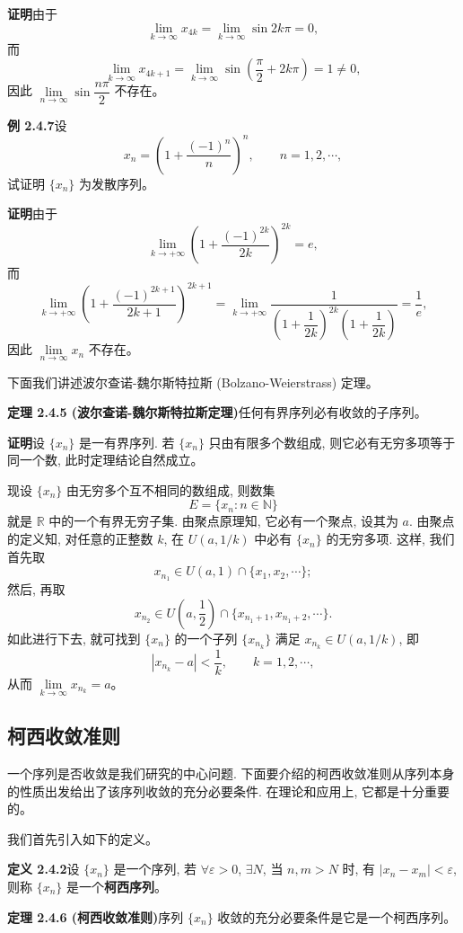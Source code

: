 \documentclass[UTF8, 12pt, fontset=fandol, oneside]{ctexart}
\begin{document}
\noindent\textbf{证明}\quad 由于
\[
  \lim_{k\to\infty}x_{4k}
  =
  \lim_{k\to\infty}\sin2k\pi=0,
\]
而
\[
  \lim_{k\to\infty}x_{4k+1}
  =
  \lim_{k\to\infty}\sin\left(\frac\pi2+2k\pi\right)=1\ne0,
\]
因此 $\lim\limits_{n\to\infty}\sin\dfrac{n\pi}{2}$ 不存在。

\noindent\textbf{例 2.4.7}\quad 设
\[
  x_n=\left(1+\frac{(-1)^n}{n}\right)^n,\qquad n=1,2,\cdots,
\]
试证明 $\{x_n\}$ 为发散序列。

\noindent\textbf{证明}\quad 由于
\[
  \lim_{k\to+\infty}\left(1+\frac{(-1)^{2k}}{2k}\right)^{2k}=e,
\]
而
\[
  \lim_{k\to+\infty}\left(1+\frac{(-1)^{2k+1}}{2k+1}\right)^{2k+1}
  =
  \lim_{k\to+\infty}\frac1{\left(1+\dfrac1{2k}\right)^{2k}\left(1+\dfrac1{2k}\right)}
  =
  \frac1e,
\]
因此 $\lim\limits_{n\to\infty}x_n$ 不存在。

下面我们讲述波尔查诺-魏尔斯特拉斯 (Bolzano-Weierstrass) 定理。

\noindent\textbf{定理 2.4.5 (波尔查诺-魏尔斯特拉斯定理)}\quad 任何有界序列必有收敛的子序列。

\noindent\textbf{证明}\quad 设 $\{x_n\}$ 是一有界序列. 若 $\{x_n\}$ 只由有限多个数组成, 则它必有无穷多项等于同一个数, 此时定理结论自然成立。

现设 $\{x_n\}$ 由无穷多个互不相同的数组成, 则数集
\[
  E=\{x_n:n\in\mathbb{N}\}
\]
就是 $\mathbb{R}$ 中的一个有界无穷子集. 由聚点原理知, 它必有一个聚点, 设其为 $a$. 由聚点的定义知, 对任意的正整数 $k$, 在 $U(a,1/k)$ 中必有 $\{x_n\}$ 的无穷多项. 这样, 我们首先取
\[
  x_{n_1}\in U(a,1)\cap\{x_1,x_2,\cdots\};
\]
然后, 再取
\[
  x_{n_2}\in U\left(a,\frac12\right)\cap\{x_{n_1+1},x_{n_1+2},\cdots\}.
\]
如此进行下去, 就可找到 $\{x_n\}$ 的一个子列 $\{x_{n_k}\}$ 满足 $x_{n_k}\in U(a,1/k)$, 即
\[
  |x_{n_k}-a|<\frac1k,\qquad k=1,2,\cdots,
\]
从而 $\lim\limits_{k\to\infty}x_{n_k}=a$。

\subsection{柯西收敛准则}

一个序列是否收敛是我们研究的中心问题. 下面要介绍的柯西收敛准则从序列本身的性质出发给出了该序列收敛的充分必要条件. 在理论和应用上, 它都是十分重要的。

我们首先引入如下的定义。

\noindent\textbf{定义 2.4.2}\quad 设 $\{x_n\}$ 是一个序列, 若 $\forall\varepsilon>0$, $\exists N$, 当 $n,m>N$ 时, 有 $|x_n-x_m|<\varepsilon$, 则称 $\{x_n\}$ 是一个\textbf{柯西序列}。

\noindent\textbf{定理 2.4.6 (柯西收敛准则)}\quad 序列 $\{x_n\}$ 收敛的充分必要条件是它是一个柯西序列。
\end{document}
